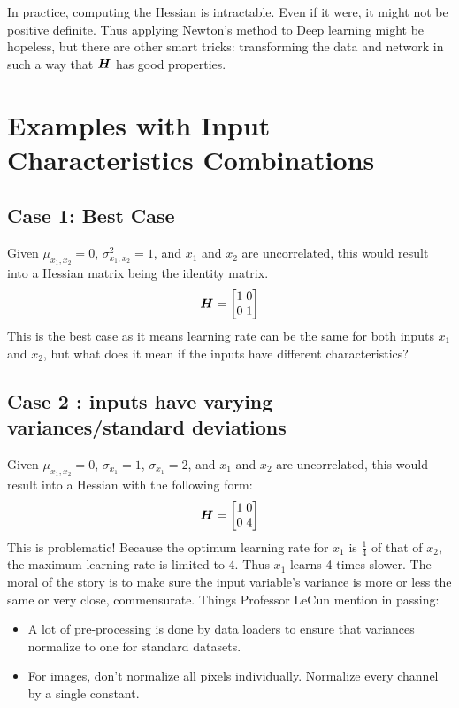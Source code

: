 In practice, computing the Hessian is intractable. Even if it were, it might not be positive definite. Thus applying Newton's method to Deep learning might be hopeless, but there are other smart tricks: transforming the data and network in such a way that $\matr{H}$ has good properties.

\section{Examples with Input Characteristics Combinations}

\subsection{Case 1: Best Case}
Given $\mu_{x_{1},x_{2}} = 0$, $\sigma_{x_{1},x_{2}}^2 = 1$, and $x_1$ and $x_2$ are uncorrelated, this would result into a Hessian matrix being the identity matrix.
$$\matr{H} = \begin{bmatrix}
    1\;0\\
    0\;1\\
\end{bmatrix}$$ 
This is the best case as it means learning rate can be the same for both inputs $x_1$ and $x_2$, but what does it mean if the inputs have different characteristics?

\subsection{Case 2 : inputs have varying variances/standard deviations}
Given $\mu_{x_{1},x_{2}} = 0$, $\sigma_{x_{1}} = 1$, $\sigma_{x_{1}} = 2$, and $x_1$ and $x_2$ are uncorrelated, this would result into a Hessian with the following form:
$$\matr{H} = \begin{bmatrix}
    1\;0\\
    0\;4\\
\end{bmatrix}$$
This is problematic! Because the optimum learning rate for $x_1$ is $\frac{1}{4}$ of that of $x_2$, the maximum learning rate is limited to 4. Thus $x_1$ learns 4 times slower. The moral of the story is to make sure the input variable's variance is more or less the same or very close, commensurate. Things Professor LeCun mention in passing:
\begin{itemize}
    \item A lot of pre-processing is done by data loaders to ensure that variances normalize to one for standard datasets.
    \item For images, don't normalize all pixels individually. Normalize every channel by a single constant.
\end{itemize}

